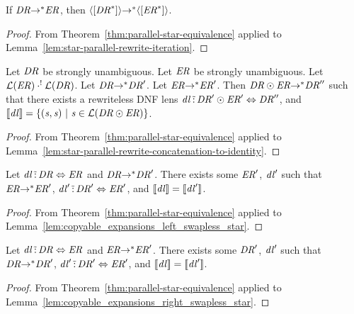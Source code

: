 \documentclass[numbers,10pt,preprint\ifanon ,nocopyrightspace\fi]{sigplanconf}
\begin{document}
\begin{corollary}
  \label{cor:rewrite-maintained-iteration}
  If $\mathit{DR} {\rightarrow}^* \mathit{ER}$, then
  $\langle[{\mathit{DR}}^*]\rangle {\ensuremath{\rightarrow}}^*
  \langle[{\mathit{ER}}^*]\rangle$.
\end{corollary}
\begin{proof}
  From Theorem~\ref{thm:parallel-star-equivalence} applied to
  Lemma~\ref{lem:star-parallel-rewrite-iteration}.
\end{proof}

\begin{corollary}
  \label{cor:star-rewrite-maintained-concat-to-identity}
  Let $\mathit{DR}$ be strongly unambiguous.  Let $\mathit{ER}$ be strongly
  unambiguous.
  Let $\mathcal{L}(\mathit{ER}) \cdot^! \mathcal{L}(\mathit{DR})$.
  Let $\mathit{DR} {\rightarrow}^* \mathit{DR}'$.
  Let $\mathit{ER} {\rightarrow}^* \mathit{ER}'$.
  Then $\mathit{DR} \odot \mathit{ER} {\rightarrow}^* \mathit{DR}''$ such
  that
  there exists a rewriteless DNF lens
  $\mathit{dl} \,\tilde{:}\,
  \mathit{DR}' \odot \mathit{ER}' \Leftrightarrow \mathit{DR}''$, and
  $[ \! [\mathit{dl}] \! ] =
  \{(\mathit{s},\mathit{s}) ~|~ \mathit{s} \in
    \mathcal{L}(\mathit{DR} \odot \mathit{ER})\}$.
\end{corollary}
\begin{proof}
  From Theorem~\ref{thm:parallel-star-equivalence} applied to
  Lemma~\ref{lem:star-parallel-rewrite-concatenation-to-identity}.
\end{proof}

\begin{corollary}
  \label{cor:copyable_expansions_left_serialized_star}
  Let $\mathit{dl} \,\tilde{:}\, \mathit{DR} \Leftrightarrow
  \mathit{ER}$ and $\mathit{DR} {\rightarrow}^* \mathit{DR}'$.  There
  exists some
  $\mathit{ER}'$, $\mathit{dl}'$ such that $\mathit{ER}
  {\rightarrow}^* \mathit{ER}'$,
  $\mathit{dl}' \,\tilde{:}\,
  \mathit{DR}' \Leftrightarrow \mathit{ER}'$, and $[ \! [\mathit{dl}] \! ] =
  [ \! [\mathit{dl}'] \! ]$.
\end{corollary}
\begin{proof}
  From Theorem~\ref{thm:parallel-star-equivalence} applied to
  Lemma~\ref{lem:copyable_expansions_left_swapless_star}.
\end{proof}

\begin{corollary}
  \label{cor:copyable_expansions_right_serialized_star}
  Let $\mathit{dl} \,\tilde{:}\, \mathit{DR} \Leftrightarrow
  \mathit{ER}$ and $\mathit{ER} {\rightarrow}^* \mathit{ER}'$.  There
  exists some
  $\mathit{DR}'$, $\mathit{dl}'$ such that $\mathit{DR}
  {\rightarrow}^* \mathit{DR}'$,
  $\mathit{dl}' \,\tilde{:}\,
  \mathit{DR}' \Leftrightarrow \mathit{ER}'$, and $[ \! [\mathit{dl}] \! ] =
  [ \! [\mathit{dl}'] \! ]$.
\end{corollary}
\begin{proof}
  From Theorem~\ref{thm:parallel-star-equivalence} applied to
  Lemma~\ref{lem:copyable_expansions_right_swapless_star}.
\end{proof}
\end{document}
